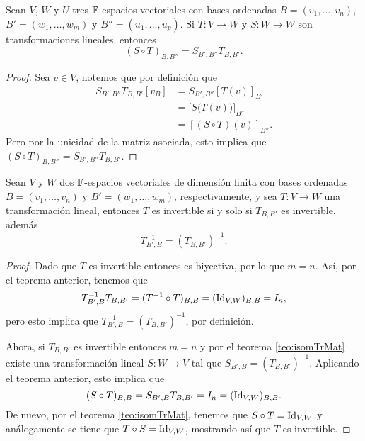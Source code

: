 \begin{teor}
  Sean $V$, $W$ y $U$ tres $\mathbb{F}$-espacios vectoriales con bases ordenadas $B = (v_1,\ldots,v_n)$, $B' = (w_1,\ldots,w_m)$ y $B'' = (u_1,\ldots,u_p)$. Si $T\colon V \to W$ y $S\colon W \to W$ son transformaciones lineales, entonces
  \[ (S \circ T)_{B,B''} = S_{B',B''} T_{B,B'}. \]
\end{teor}
\begin{proof}
  Sea $v \in V$, notemos que por definición que
    \begin{align*}
      S_{B',B''} T_{B,B'}[v_B] &= S_{B',B''}[T(v)]_{B'} \\
        &= \bigl[ S\bigl(T(v)\bigr) \bigr]_{B''} \\
        &= [(S\circ T)(v)]_{B''}.
    \end{align*}
  Pero por la unicidad de la matriz asociada, esto implica que $(S \circ T)_{B,B''} = S_{B',B''} T_{B,B'}$.
\end{proof}

\begin{coro}
  Sean $V$ y $W$ dos $\mathbb{F}$-espacios vectoriales de dimensión finita con bases ordenadas $B = (v_1,\ldots,v_n)$ y $B' = (w_1,\ldots,w_m)$, respectivamente, y sea $T\colon V \to W$ una transformación lineal, entonces $T$ es invertible si y solo si $T_{B,B'}$ es invertible, además
    \[ T_{B',B}^{-1} = (T_{B,B'})^{-1}. \]
\end{coro}
\begin{proof}
  Dado que $T$ es invertible entonces es biyectiva, por lo que $m = n$. Así, por el teorema anterior, tenemos que
  \[ T^{-1}_{B',B} T_{B,B'} = (T^{-1}\circ T)_{B,B} = (\mathrm{Id}_{V,W})_{B,B} = I_n, \]
  pero esto impĺica que $T_{B',B}^{-1} = (T_{B,B'})^{-1}$, por definición.

  Ahora, si $T_{B,B'}$ es invertible entonces $m = n$ y por el teorema \ref{teo:isomTrMat} existe una transformación lineal $S\colon W \to V$ tal que $S_{B',B} =  (T_{B,B'})^{-1}$. Aplicando el teorema anterior, esto implica que
    \[ (S \circ T)_{B,B} =  S_{B',B}T_{B,B'} = I_n = (\mathrm{Id}_{V,W})_{B,B}. \]
  De nuevo, por el teorema \ref{teo:isomTrMat}, tenemos que $S \circ T = \mathrm{Id}_{V,W}$ y análogamente se tiene que $T \circ S = \mathrm{Id}_{V,W}$, mostrando así que $T$ es invertible.
\end{proof}

